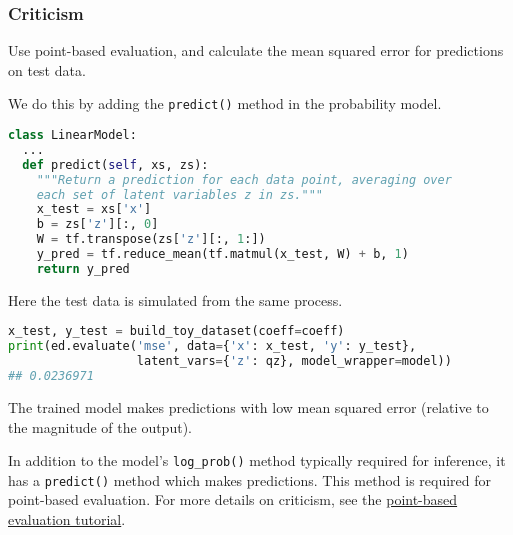 \subsubsection{Criticism}

Use point-based evaluation, and calculate the mean squared
error for predictions on test data.

We do this by adding the \texttt{predict()} method in the
probability model.
\begin{lstlisting}[language=Python]
class LinearModel:
  ...
  def predict(self, xs, zs):
    """Return a prediction for each data point, averaging over
    each set of latent variables z in zs."""
    x_test = xs['x']
    b = zs['z'][:, 0]
    W = tf.transpose(zs['z'][:, 1:])
    y_pred = tf.reduce_mean(tf.matmul(x_test, W) + b, 1)
    return y_pred
\end{lstlisting}

Here the test data is simulated from the same process.
\begin{lstlisting}[language=Python]
x_test, y_test = build_toy_dataset(coeff=coeff)
print(ed.evaluate('mse', data={'x': x_test, 'y': y_test},
                  latent_vars={'z': qz}, model_wrapper=model))
## 0.0236971
\end{lstlisting}

The trained model makes predictions with low mean squared error
(relative to the magnitude of the output).

In addition to the model's \texttt{log_prob()} method typically required for
inference, it has a \texttt{predict()} method which makes
predictions. This method is required for point-based evaluation. For
more details on criticism, see the \href{tut_point_eval.html}{point-based
evaluation tutorial}.
